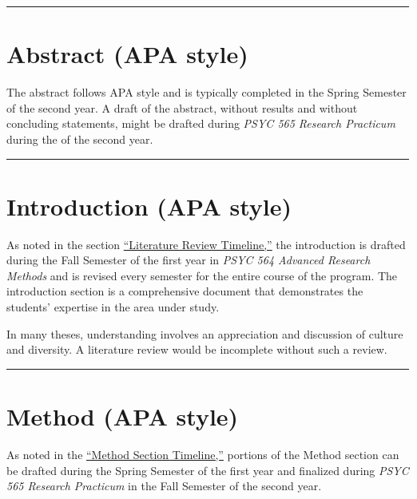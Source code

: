 \documentclass[openany]{book}
\begin{document}
\begin{center}\rule{0.5\linewidth}{0.5pt}\end{center}

\hypertarget{abstract-apa-style}{%
\section{Abstract (APA style)}\label{abstract-apa-style}}

The abstract follows APA style and is typically completed in the Spring Semester of the second year. A draft of the abstract, without results and without concluding statements, might be drafted during \emph{PSYC 565 Research Practicum} during the of the second year.

\begin{center}\rule{0.5\linewidth}{0.5pt}\end{center}

\hypertarget{introduction-apa-style}{%
\section{Introduction (APA style)}\label{introduction-apa-style}}

As noted in the section \protect\hyperlink{litreview}{``Literature Review Timeline,''} the introduction is drafted during the Fall Semester of the first year in \emph{PSYC 564 Advanced Research Methods} and is revised every semester for the entire course of the program. The introduction section is a comprehensive document that demonstrates the students' expertise in the area under study.

In many theses, understanding involves an appreciation and discussion of culture and diversity. A literature review would be incomplete without such a review.

\begin{center}\rule{0.5\linewidth}{0.5pt}\end{center}

\hypertarget{method-apa-style}{%
\section{Method (APA style)}\label{method-apa-style}}

As noted in the \protect\hyperlink{method}{``Method Section Timeline,''} portions of the Method section can be drafted during the Spring Semester of the first year and finalized during \emph{PSYC 565 Research Practicum} in the Fall Semester of the second year.
\end{document}
